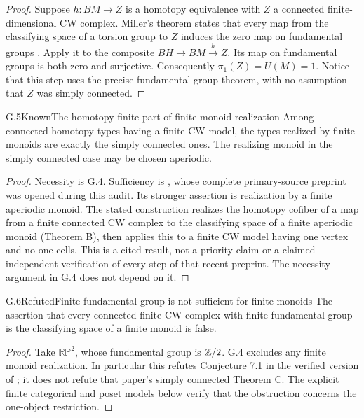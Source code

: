 \begin{proof}
Suppose $h:BM\to Z$ is a homotopy equivalence with $Z$ a connected finite-dimensional CW complex. Miller's theorem states that every map from the classifying space of a torsion group to $Z$ induces the zero map on fundamental groups \citep[Theorem B, p.~40]{Miller1984}. Apply it to the composite $BH\to BM\xrightarrow{h}Z$. Its map on fundamental groups is both zero and surjective. Consequently $\pi_1(Z)=U(M)=1$. Notice that this step uses the precise fundamental-group theorem, with no assumption that $Z$ was simply connected.
\end{proof}

\begin{claim}{G.5}{Known}{The homotopy-finite part of finite-monoid realization}
Among connected homotopy types having a finite CW model, the types realized by finite monoids are exactly the simply connected ones. The realizing monoid in the simply connected case may be chosen aperiodic.
\end{claim}
\begin{proof}
Necessity is G.4. Sufficiency is \citet[Theorem C, proved in Section 5]{BenBassat2026}, whose complete primary-source preprint was opened during this audit. Its stronger assertion is realization by a finite aperiodic monoid. The stated construction realizes the homotopy cofiber of a map from a finite connected CW complex to the classifying space of a finite aperiodic monoid (Theorem B), then applies this to a finite CW model having one vertex and no one-cells. This is a cited result, not a priority claim or a claimed independent verification of every step of that recent preprint. The necessity argument in G.4 does not depend on it.
\end{proof}

\begin{claim}{G.6}{Refuted}{Finite fundamental group is not sufficient for finite monoids}
The assertion that every connected finite CW complex with finite fundamental group is the classifying space of a finite monoid is false.
\end{claim}
\begin{proof}
Take $\mathbb{RP}^2$, whose fundamental group is $\mathbb Z/2$. G.4 excludes any finite monoid realization. In particular this refutes Conjecture 7.1 in the verified version of \citet{BenBassat2026}; it does not refute that paper's simply connected Theorem C. The explicit finite categorical and poset models below verify that the obstruction concerns the one-object restriction.
\end{proof}

